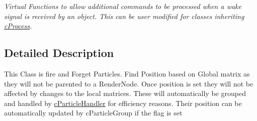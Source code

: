 \begin{DoxyCompactItemize}
\begin{DoxyCompactList}\small\item\em Virtual Functions to allow additional commands to be processed when a wake signal is received by an object. This can be user modified for classes inheriting \hyperlink{classc_process}{cProcess}. \end{DoxyCompactList}\end{DoxyCompactItemize}


\subsection{Detailed Description}
This Class is fire and Forget Particles. Find Position based on Global matrix as they will not be parented to a RenderNode. Once position is set they will not be affected by changes to the local matrices. These will automatically be grouped and handled by \hyperlink{classc_particle_handler}{cParticleHandler} for efficiency reasons. Their position can be automatically updated by cParticleGroup if the flag is set 